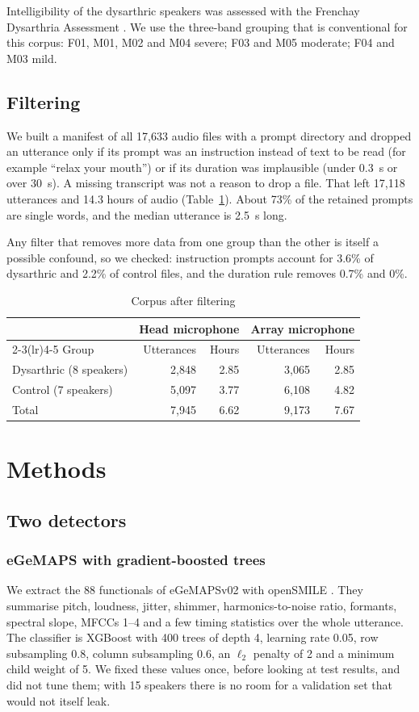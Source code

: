 \documentclass[conference]{IEEEtran}
\begin{document}
Intelligibility of the dysarthric speakers was assessed with the Frenchay Dysarthria Assessment \cite{enderby1980}. We use the three-band grouping that is conventional for this corpus: F01, M01, M02 and M04 severe; F03 and M05 moderate; F04 and M03 mild.

\subsection{Filtering}
We built a manifest of all 17,633 audio files with a prompt directory and dropped an utterance only if its prompt was an instruction instead of text to be read (for example ``relax your mouth'') or if its duration was implausible (under 0.3~s or over 30~s). A missing transcript was not a reason to drop a file. That left 17,118 utterances and 14.3 hours of audio (Table~\ref{tab:corpus}). About 73\% of the retained prompts are single words, and the median utterance is 2.5~s long.

Any filter that removes more data from one group than the other is itself a possible confound, so we checked: instruction prompts account for 3.6\% of dysarthric and 2.2\% of control files, and the duration rule removes 0.7\% and 0\%.

\begin{table}[t]
\caption{Corpus after filtering}
\label{tab:corpus}
\centering
\begin{tabular}{lrrrr}
\toprule
 & \multicolumn{2}{c}{Head microphone} & \multicolumn{2}{c}{Array microphone}\\
\cmidrule(lr){2-3}\cmidrule(lr){4-5}
Group & Utterances & Hours & Utterances & Hours\\
\midrule
Dysarthric (8 speakers) & 2,848 & 2.85 & 3,065 & 2.85\\
Control (7 speakers) & 5,097 & 3.77 & 6,108 & 4.82\\
\midrule
Total & 7,945 & 6.62 & 9,173 & 7.67\\
\bottomrule
\end{tabular}
\end{table}

\section{Methods}
\subsection{Two detectors}
\subsubsection{eGeMAPS with gradient-boosted trees}
We extract the 88 functionals of eGeMAPSv02 \cite{eyben2016} with openSMILE \cite{eyben2010}. They summarise pitch, loudness, jitter, shimmer, harmonics-to-noise ratio, formants, spectral slope, MFCCs 1--4 and a few timing statistics over the whole utterance. The classifier is XGBoost \cite{chen2016} with 400 trees of depth 4, learning rate 0.05, row subsampling 0.8, column subsampling 0.6, an $\ell_2$ penalty of 2 and a minimum child weight of 5. We fixed these values once, before looking at test results, and did not tune them; with 15 speakers there is no room for a validation set that would not itself leak.
\end{document}
